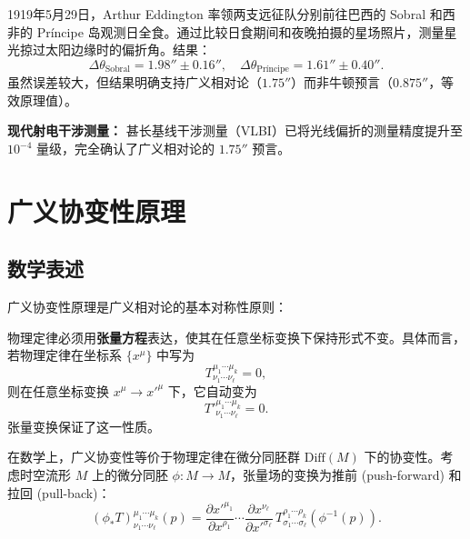 \begin{example}
1919年5月29日，Arthur Eddington 率领两支远征队分别前往巴西的 Sobral 和西非的 Pr\'{i}ncipe 岛观测日全食。通过比较日食期间和夜晚拍摄的星场照片，测量星光掠过太阳边缘时的偏折角。结果：
\begin{equation}
    \Delta\theta_{\text{Sobral}} = 1.98'' \pm 0.16'', \quad
    \Delta\theta_{\text{Pr\'{i}ncipe}} = 1.61'' \pm 0.40''.
\end{equation}
虽然误差较大，但结果明确支持广义相对论（$1.75''$）而非牛顿预言（$0.875''$，等效原理值）。

\textbf{现代射电干涉测量：} 甚长基线干涉测量（VLBI）已将光线偏折的测量精度提升至 $10^{-4}$ 量级，完全确认了广义相对论的 $1.75''$ 预言。
\end{example}

\section{广义协变性原理}

\subsection{数学表述}

广义协变性原理是广义相对论的基本对称性原则：

\begin{definition}
物理定律必须用\textbf{张量方程}表达，使其在任意坐标变换下保持形式不变。具体而言，若物理定律在坐标系 $\{x^\mu\}$ 中写为
\begin{equation}
    T^{\mu_1\cdots\mu_k}_{\nu_1\cdots\nu_\ell} = 0,
\end{equation}
则在任意坐标变换 $x^\mu \to x'^\mu$ 下，它自动变为
\begin{equation}
    T'^{\mu_1\cdots\mu_k}_{\nu_1\cdots\nu_\ell} = 0.
\end{equation}
张量变换保证了这一性质。
\end{definition}

在数学上，广义协变性等价于物理定律在微分同胚群 $\mathrm{Diff}(M)$ 下的协变性。考虑时空流形 $M$ 上的微分同胚 $\phi: M \to M$，张量场的变换为推前 (push-forward) 和拉回 (pull-back)：
\begin{equation}
    (\phi_* T)^{\mu_1\cdots\mu_k}_{\nu_1\cdots\nu_\ell}(p) 
    = \frac{\partial x'^{\mu_1}}{\partial x^{\rho_1}} \cdots 
      \frac{\partial x^{\nu_\ell}}{\partial x'^{\sigma_\ell}} \,
      T^{\rho_1\cdots\rho_k}_{\sigma_1\cdots\sigma_\ell}(\phi^{-1}(p)).
\end{equation}

